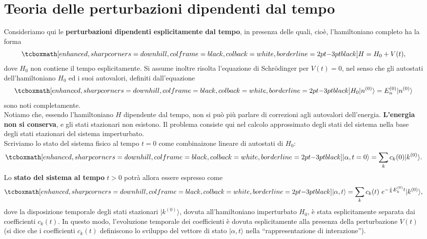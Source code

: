 \chapter[T.d.P. dipendenti dal tempo]{Teoria delle perturbazioni dipendenti dal tempo}
Consideriamo qui le \textbf{perturbazioni dipendenti esplicitamente dal tempo}, in presenza delle quali, cioè, l'hamiltoniano completo ha la forma
	\begin{equation}
		\tcboxmath[enhanced, sharp corners=downhill, colframe=black, colback=white, borderline={2pt}{-3pt}{black}]{
			H=H_0+V(t),
		}
	\end{equation}
dove $H_0$ non contiene il tempo esplicitamente. Si assume inoltre risolta l'equazione di Schr\"{o}dinger per $V(t)=0$, nel senso che gli autostati dell'hamiltoniano $H_0$ ed i suoi autovalori, definiti dall'equazione
	\begin{equation}
		\tcboxmath[enhanced, sharp corners=downhill, colframe=black, colback=white, borderline={2pt}{-3pt}{black}]{
			H_0 \vert n ^{(0)} \rangle = E_n ^{(0)} \vert n ^{(0)} \rangle 
			}
	\end{equation}
sono noti completamente.\\

Notiamo che, essendo l'hamiltoniano $H$ dipendente dal tempo, non si può più parlare di correzioni agli autovalori dell'energia. \textbf{L'energia non si conserva}, e gli stati stazionari non esistono. Il problema consiste qui nel calcolo approssimato degli stati del sistema nella base degli stati stazionari del sistema imperturbato.\\

Scriviamo lo stato del sistema fisico al tempo $t=0$ come combinaizone lineare di autostati di $H_0$:
	\begin{equation}
		\tcboxmath[enhanced, sharp corners=downhill, colframe=black, colback=white, borderline={2pt}{-3pt}{black}]{
			\vert \alpha ,t=0  \rangle = \sum _k c_k (0) \vert k ^{(0)} \rangle .
			}
	\label{eq:cap15_1}
	\end{equation}
Lo \textbf{stato del sistema al tempo} $t>0$ potrà allora essere espresso come
	\begin{equation}
		\tcboxmath[enhanced, sharp corners=downhill, colframe=black, colback=white, borderline={2pt}{-3pt}{black}]{
			\vert \alpha ,t  \rangle = \sum _k c_k (t)\ e^{-\frac{i}{\hbar}E_k ^{(0)} t } \vert k ^{(0)} \rangle ,
			}
	\label{eq:cap15_2}
	\end{equation}
dove la disposizione temporale degli stati stazionari $\vert k ^{(0)} \rangle$, dovuta all'hamiltoniano imperturbato $H_0$, è stata esplicitamente separata dai coefficienti $c_k {(t)}$. In questo modo, l'evoluzione temporale dei coefficienti è dovuta esplicitamente alla presenza della perturbazione $V(t)$  (si dice che i coefficienti $c_k (t)$ definiscono lo sviluppo del vettore di stato $\vert \alpha , t \rangle $ nella ``rappresentazione di interazione'').\\

